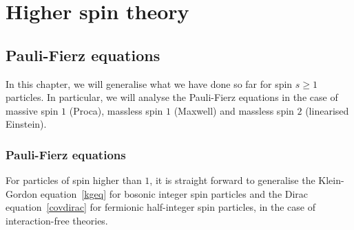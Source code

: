 \part{Higher spin theory}

\chapter{Pauli-Fierz equations} 

    In this chapter, we will generalise what we have done so far for spin $s \geq 1$ particles. In particular, we will analyse the Pauli-Fierz equations in the case of massive spin $1$ (Proca), massless spin $1$ (Maxwell) and massless spin $2$ (linearised Einstein).

\section{Pauli-Fierz equations}

    For particles of spin higher than $1$, it is straight forward to generalise the Klein-Gordon equation~\eqref{kgeq} for bosonic integer spin particles and the Dirac equation~\eqref{covdirac} for fermionic half-integer spin particles, in the case of interaction-free theories. 

